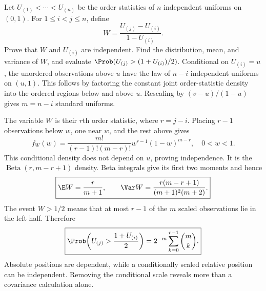 Let $U_{(1)}<\cdots<U_{(n)}$ be the order statistics of $n$ independent uniforms on $(0,1)$. For $1\le i<j\le n$, define
\[
W=\frac{U_{(j)}-U_{(i)}}{1-U_{(i)}}.
\]
Prove that $W$ and $U_{(i)}$ are independent. Find the distribution, mean, and variance of $W$, and evaluate $\Prob(U_{(j)}>(1+U_{(i)})/2)$.
\solution Conditional on $U_{(i)}=u$, the unordered observations above $u$ have the law of $n-i$ independent uniforms on $(u,1)$. This follows by factoring the constant joint order-statistic density into the ordered regions below and above $u$. Rescaling by $(v-u)/(1-u)$ gives $m=n-i$ standard uniforms.

The variable $W$ is their $r$th order statistic, where $r=j-i$. Placing $r-1$ observations below $w$, one near $w$, and the rest above gives
\[
f_W(w)=\frac{m!}{(r-1)!(m-r)!}
 w^{r-1}(1-w)^{m-r},\quad0<w<1.
\]
This conditional density does not depend on $u$, proving independence. It is the $\operatorname{Beta}(r,m-r+1)$ density. Beta integrals give its first two moments and hence
\[
\boxed{\E W=\frac r{m+1},\qquad
\Var W=\frac{r(m-r+1)}{(m+1)^2(m+2)}.}
\]
The event $W>1/2$ means that at most $r-1$ of the $m$ scaled observations lie in the left half. Therefore
\[
\boxed{\Prob\!\left(U_{(j)}>\frac{1+U_{(i)}}2\right)
=2^{-m}\sum_{k=0}^{r-1}\binom mk.}
\]
\insight Absolute positions are dependent, while a conditionally scaled relative position can be independent. Removing the conditional scale reveals more than a covariance calculation alone.
